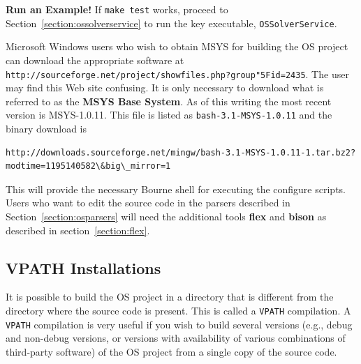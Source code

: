 \documentclass[11pt]{article}
\renewcommand{\_}{{\char"5F}}
\renewcommand{\{}{{\char"7B}}
\renewcommand{\}}{{\char"7D}}
\renewcommand{\^}{{\char"0D}}
\renewcommand{\'}{{\char"0D}}
\begin{document}
{\bf Run an Example!}  If {\tt make test} works, proceed to Section~\ref{section:ossolverservice} to run the key executable, {\tt OSSolverService}.


Microsoft Windows users who wish to obtain MSYS for building the OS project can download
the appropriate software at
{\tt http://sourceforge.net/project/showfiles.php?group\_id=2435}.
The user may find this Web site confusing.
It is only necessary to  download what is referred to as the {\bf MSYS Base System}.
As of this writing the most recent version is MSYS-1.0.11.
This file is listed as {\tt bash-3.1-MSYS-1.0.11} and the  binary download is

{\footnotesize
\begin{verbatim}
http://downloads.sourceforge.net/mingw/bash-3.1-MSYS-1.0.11-1.tar.bz2?modtime=1195140582\&big\_mirror=1
\end{verbatim}
}

This will provide the necessary Bourne shell for executing the configure scripts.
Users who want to edit the source code in the parsers described in
Section~\ref{section:osparsers} will need the additional  tools
{\bf flex} and {\bf bison} as described in section~\ref{section:flex}.%
%



\subsection{VPATH Installations} \label{section:vpath}

%
It is possible to build the OS project in a directory that is different from
the directory where the source code is present. This is called a {\tt VPATH}
compilation.  A {\tt VPATH}  compilation  is very useful if you wish to
build several versions (e.g., debug and non-debug versions, or versions with
availability of various combinations of third-party software) of the OS
project from a single copy of the source code.
\end{document}
